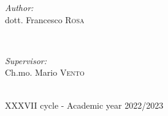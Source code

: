 \begin{titlepage}
    \begin{minipage}{0.4\textwidth}
        \begin{flushleft} \large
            \emph{Author:} \\
            dott. Francesco \textsc{Rosa} \newline
        \end{flushleft}
    \end{minipage}
    ~
    \begin{minipage}{0.37\textwidth}
        \begin{flushright} \large
            \emph{Supervisor:} \\
            \hfill Ch.mo. Mario \textsc{Vento}\newline
        \end{flushright}
    \end{minipage}\\[1.5cm]



    {\large XXXVII cycle - Academic year 2022/2023}\\[1cm] %



    \vfill %
\end{titlepage}